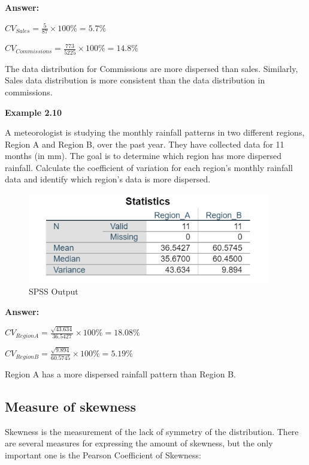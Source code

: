 \documentclass[
  a4paper,
  DIV=11,
  numbers=noendperiod,
  oneside]{scrreprt}
\begin{document}
{\textbf{Answer:}}

{\(CV_{Sales} = \frac{5}{87} \times 100\% = 5.7\%\)}

\(CV_{Commissions} = \frac{773}{5225} \times 100\% = 14.8\%\)

The data distribution for Commissions are more dispersed than sales.
Similarly, Sales data distribution is more consistent than the data
distribution in commissions.

{\textbf{Example 2.10}}

A meteorologist is studying the monthly rainfall patterns in two
different regions, Region A and Region B, over the past year. They have
collected data for 11 months (in mm). The goal is to determine which
region has more dispersed rainfall. Calculate the coefficient of
variation for each region's monthly rainfall data and identify which
region's data is more dispersed.

\begin{figure}

{\centering \includegraphics[width=4.16667in,height=\textheight]{images/ch2/picture13.png}

}

\caption{SPSS Output}

\end{figure}

{\textbf{Answer:}}

{\(CV_{Region A} = \frac{\sqrt{43.634}}{36.5427} \times 100\% = 18.08\%\)}

\(CV_{Region B} = \frac{\sqrt{9.894}}{60.5745} \times 100\% = 5.19\%\)

Region A has a more dispersed rainfall pattern than Region B.

\hypertarget{measure-of-skewness}{%
\subsection{Measure of skewness}\label{measure-of-skewness}}

Skewness is the measurement of the lack of symmetry of the distribution.
There are several measures for expressing the amount of skewness, but
the only important one is the Pearson Coefficient of Skewness:
\end{document}
